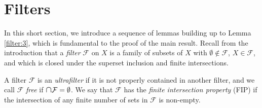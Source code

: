 \section{Filters}
In this short section, we introduce a sequence of lemmas building up to Lemma \ref{filter:3}, which is fundamental to the proof of the main result. Recall from the introduction that a \emph{filter} \( \mathcal{F}  \) on \( X \) is a family of subsets of \( X \) with \( \emptyset \notin \mathcal{F}  \), \( X \in \mathcal{F}  \), and which is closed under the superset inclusion and finite intersections.

A filter \( \mathcal{F}  \) is an \emph{ultrafilter} if it is not properly contained in another filter, and we call \( \mathcal{F}  \) \emph{free} if \( \medcap \mathcal{F} = \emptyset  \). We say that \( \mathcal{F}  \) has the \emph{finite intersection property} (FIP) if the intersection of any finite number of sets in \( \mathcal{F}  \) is non-empty. 

